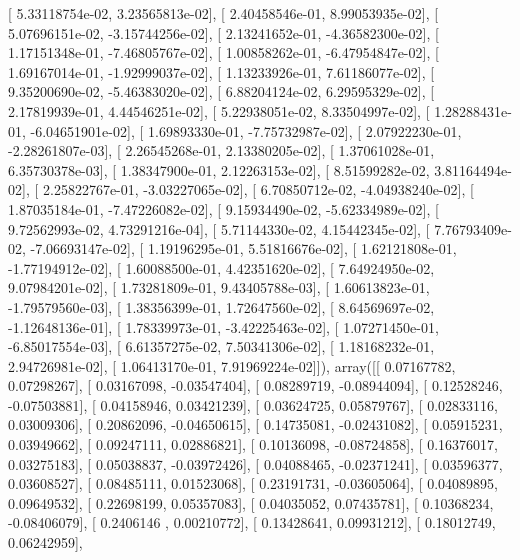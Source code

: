 \documentclass{article}
\begin{document}
       [  5.33118754e-02,   3.23565813e-02],
       [  2.40458546e-01,   8.99053935e-02],
       [  5.07696151e-02,  -3.15744256e-02],
       [  2.13241652e-01,  -4.36582300e-02],
       [  1.17151348e-01,  -7.46805767e-02],
       [  1.00858262e-01,  -6.47954847e-02],
       [  1.69167014e-01,  -1.92999037e-02],
       [  1.13233926e-01,   7.61186077e-02],
       [  9.35200690e-02,  -5.46383020e-02],
       [  6.88204124e-02,   6.29595329e-02],
       [  2.17819939e-01,   4.44546251e-02],
       [  5.22938051e-02,   8.33504997e-02],
       [  1.28288431e-01,  -6.04651901e-02],
       [  1.69893330e-01,  -7.75732987e-02],
       [  2.07922230e-01,  -2.28261807e-03],
       [  2.26545268e-01,   2.13380205e-02],
       [  1.37061028e-01,   6.35730378e-03],
       [  1.38347900e-01,   2.12263153e-02],
       [  8.51599282e-02,   3.81164494e-02],
       [  2.25822767e-01,  -3.03227065e-02],
       [  6.70850712e-02,  -4.04938240e-02],
       [  1.87035184e-01,  -7.47226082e-02],
       [  9.15934490e-02,  -5.62334989e-02],
       [  9.72562993e-02,   4.73291216e-04],
       [  5.71144330e-02,   4.15442345e-02],
       [  7.76793409e-02,  -7.06693147e-02],
       [  1.19196295e-01,   5.51816676e-02],
       [  1.62121808e-01,  -1.77194912e-02],
       [  1.60088500e-01,   4.42351620e-02],
       [  7.64924950e-02,   9.07984201e-02],
       [  1.73281809e-01,   9.43405788e-03],
       [  1.60613823e-01,  -1.79579560e-03],
       [  1.38356399e-01,   1.72647560e-02],
       [  8.64569697e-02,  -1.12648136e-01],
       [  1.78339973e-01,  -3.42225463e-02],
       [  1.07271450e-01,  -6.85017554e-03],
       [  6.61357275e-02,   7.50341306e-02],
       [  1.18168232e-01,   2.94726981e-02],
       [  1.06413170e-01,   7.91969224e-02]]), array([[ 0.07167782,  0.07298267],
       [ 0.03167098, -0.03547404],
       [ 0.08289719, -0.08944094],
       [ 0.12528246, -0.07503881],
       [ 0.04158946,  0.03421239],
       [ 0.03624725,  0.05879767],
       [ 0.02833116,  0.03009306],
       [ 0.20862096, -0.04650615],
       [ 0.14735081, -0.02431082],
       [ 0.05915231,  0.03949662],
       [ 0.09247111,  0.02886821],
       [ 0.10136098, -0.08724858],
       [ 0.16376017,  0.03275183],
       [ 0.05038837, -0.03972426],
       [ 0.04088465, -0.02371241],
       [ 0.03596377,  0.03608527],
       [ 0.08485111,  0.01523068],
       [ 0.23191731, -0.03605064],
       [ 0.04089895,  0.09649532],
       [ 0.22698199,  0.05357083],
       [ 0.04035052,  0.07435781],
       [ 0.10368234, -0.08406079],
       [ 0.2406146 ,  0.00210772],
       [ 0.13428641,  0.09931212],
       [ 0.18012749,  0.06242959],
\end{document}
